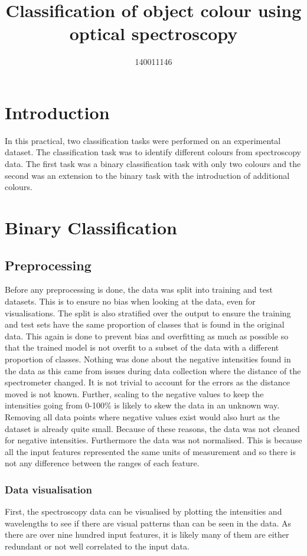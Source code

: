 \documentclass{article}
\title{Classification of object colour using optical spectroscopy}
\author{140011146}
\begin{document}



\section{Introduction}

In this practical, two classification tasks were performed on an experimental dataset. The classification task was to identify different colours from spectroscopy data. The first task was a binary classification task with only two colours and the second was an extension to the binary task with the introduction of additional colours. 

\section{Binary Classification}

\subsection{Preprocessing}
Before any preprocessing is done, the data was split into training and test datasets. This is to ensure no bias when looking at the data, even for visualisations. The split is also stratified over the output to ensure the training and test sets have the same proportion of classes that is found in the original data. This again is done to prevent bias and overfitting as much as possible so that the trained model is not overfit to a subset of the data with a different proportion of classes. 
\n
Nothing was done about the negative intensities found in the data as this came from issues during data collection where the distance of the spectrometer changed. It is not trivial to account for the errors as the distance moved is not known. Further, scaling to the negative values to keep the intensities going from 0-100\% is likely to skew the data in an unknown way. Removing all data points where negative values exist would also hurt as the dataset is already quite small. Because of these reasons, the data was not cleaned for negative intensities. Furthermore the data was not normalised. This is because all the input features represented the same units of measurement and so there is not any difference between the ranges of each feature. 


\subsubsection{Data visualisation}
First, the spectroscopy data can be visualised by plotting the intensities and wavelengths to see if there are visual patterns than can be seen in the data. As there are over nine hundred input features, it is likely many of them are either redundant or not well correlated to the input data. 
\end{document}

